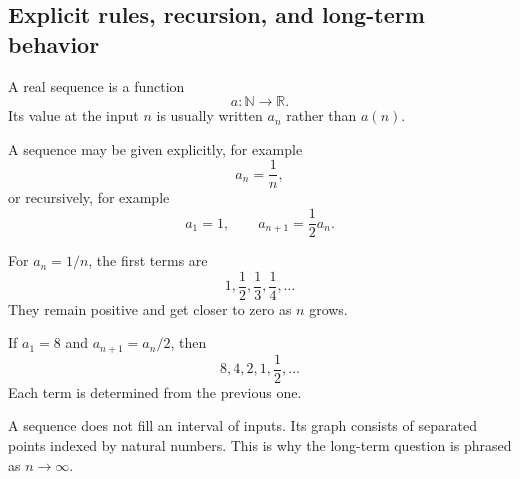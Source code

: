 \subsection{Explicit rules, recursion, and long-term behavior}

\begin{definitionbox}[Sequence]
A real sequence is a function
\[
a:\mathbb N\to\mathbb R.
\]
Its value at the input $n$ is usually written $a_n$ rather than $a(n)$.
\end{definitionbox}

A sequence may be given explicitly, for example
\[
a_n=\frac{1}{n},
\]
or recursively, for example
\[
a_1=1,
\qquad
a_{n+1}=\frac12a_n.
\]

\begin{examplebox}
For $a_n=1/n$, the first terms are
\[
1,\frac12,\frac13,\frac14,\ldots
\]
They remain positive and get closer to zero as $n$ grows.
\end{examplebox}

\begin{examplebox}
If $a_1=8$ and $a_{n+1}=a_n/2$, then
\[
8,4,2,1,\frac12,\ldots
\]
Each term is determined from the previous one.
\end{examplebox}

\begin{interpretationbox}
A sequence does not fill an interval of inputs. Its graph consists of separated points indexed by natural numbers. This is why the long-term question is phrased as $n\to\infty$.
\end{interpretationbox}

